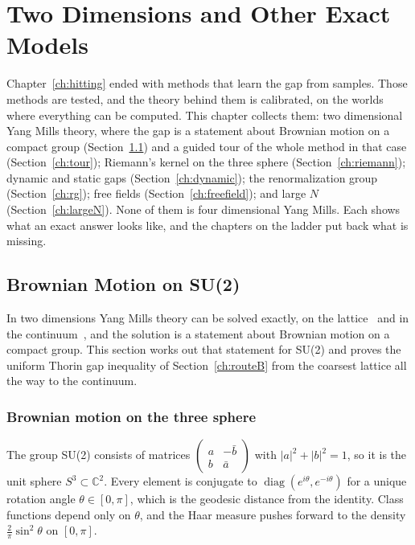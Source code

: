 \chapter{Two Dimensions and Other Exact Models}\label{ch:twod}

Chapter~\ref{ch:hitting} ended with methods that learn the gap from samples. Those methods are tested, and the theory behind them is calibrated, on the worlds where everything can be computed. This chapter collects them: two dimensional Yang Mills theory, where the gap is a statement about Brownian motion on a compact group (Section~\ref{sec:su2bm}) and a guided tour of the whole method in that case (Section~\ref{ch:tour}); Riemann's kernel on the three sphere (Section~\ref{ch:riemann}); dynamic and static gaps (Section~\ref{ch:dynamic}); the renormalization group (Section~\ref{ch:rg}); free fields (Section~\ref{ch:freefield}); and large $N$ (Section~\ref{ch:largeN}). None of them is four dimensional Yang Mills. Each shows what an exact answer looks like, and the chapters on the ladder put back what is missing.

\section{Brownian Motion on SU(2)}\label{sec:su2bm}

In two dimensions Yang Mills theory can be solved exactly, on the lattice~\cite{Mi75} and in the continuum~\cite{GKS89,Se97,Le03}, and the solution is a statement about Brownian motion on a compact group. This section works out that statement for SU(2) and proves the uniform Thorin gap inequality of Section~\ref{ch:routeB} from the coarsest lattice all the way to the continuum.

\subsection{Brownian motion on the three sphere}

The group SU(2) consists of matrices $\begin{pmatrix}a&-\bar b\\ b&\bar a\end{pmatrix}$ with $|a|^2+|b|^2=1$, so it is the unit sphere $S^3\subset\mathbb C^2$. Every element is conjugate to $\operatorname{diag}(e^{i\theta},e^{-i\theta})$ for a unique rotation angle $\theta\in[0,\pi]$, which is the geodesic distance from the identity. Class functions depend only on $\theta$, and the Haar measure pushes forward to the density $\frac2\pi\sin^2\theta$ on $[0,\pi]$.

